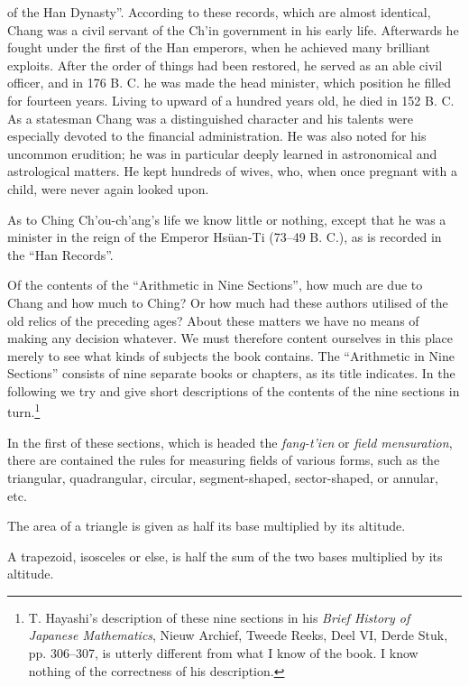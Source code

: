 \documentclass[11pt]{article}
\newcommand{\scanpage}[2]{\clearpage\setcounter{footnote}{0}\noindent{\footnotesize\color{gray}PDF page #1 · #2}\par\medskip}
\begin{document}
\scanpage{0024}{Chapter 3, printed page 10}
\setcounter{footnote}{0}
of the Han Dynasty''. According to these records, which are almost identical, Chang was a civil servant of the Ch'in government in his early life. Afterwards he fought under the first of the Han emperors, when he achieved many brilliant exploits. After the order of things had been restored, he served as an able civil officer, and in 176 B. C. he was made the head minister, which position he filled for fourteen years. Living to upward of a hundred years old, he died in 152 B. C. As a statesman Chang was a distinguished character and his talents were especially devoted to the financial administration. He was also noted for his uncommon erudition; he was in particular deeply learned in astronomical and astrological matters. He kept hundreds of wives, who, when once pregnant with a child, were never again looked upon.

As to Ching Ch'ou-ch'ang's life we know little or nothing, except that he was a minister in the reign of the Emperor Hsüan-Ti (73--49 B. C.), as is recorded in the ``Han Records''.

Of the contents of the ``Arithmetic in Nine Sections'', how much are due to Chang and how much to Ching? Or how much had these authors utilised of the old relics of the preceding ages? About these matters we have no means of making any decision whatever. We must therefore content ourselves in this place merely to see what kinds of subjects the book contains. The ``Arithmetic in Nine Sections'' consists of nine separate books or chapters, as its title indicates. In the following we try and give short descriptions of the contents of the nine sections in turn.\footnote{T. Hayashi's description of these nine sections in his \emph{Brief History of Japanese Mathematics}, Nieuw Archief, Tweede Reeks, Deel VI, Derde Stuk, pp. 306--307, is utterly different from what I know of the book. I know nothing of the correctness of his description.}

In the first of these sections, which is headed the \emph{fang-t'ien} or \emph{field mensuration}, there are contained the rules for measuring fields of various forms, such as the triangular, quadrangular, circular, segment-shaped, sector-shaped, or annular, etc.

The area of a triangle is given as half its base multiplied by its altitude.

A trapezoid, isosceles or else, is half the sum of the two bases multiplied by its altitude.
\end{document}
